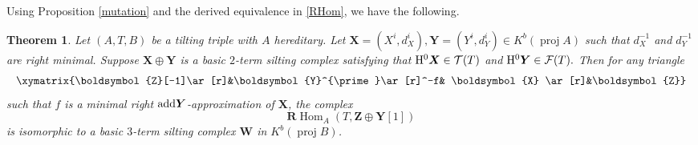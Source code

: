 \documentclass[reqno,12pt]{amsart}
\numberwithin{equation}{section}
\theoremstyle{plain}
\newtheorem{theorem}{\bf Theorem}[section]
\theoremstyle{definition}
\begin{document}
Using Proposition \ref{mutation} and the derived equivalence in \eqref{RHom}, we have the following.
\begin{theorem}\label{main1}
Let $(A, T, B)$ be a tilting triple with $A$ hereditary. Let \( \boldsymbol{X} = (X^i,d_X^i), \boldsymbol{Y} = (Y^i,d_Y^i) \in K^b(\operatorname{proj} A) \) such that $d_X^{-1}$ and $d_Y^{-1}$ are right minimal.
Suppose $\boldsymbol{X} \oplus \boldsymbol{Y}$ is a basic $2$-term silting complex satisfying that
\({\rm H}^{0}\boldsymbol{X} \in \mathcal{T}(T)\) and \({\rm H}^{0} \boldsymbol{Y} \in \mathcal{F}(T).\)
Then for any triangle
\begin{equation}\label{star3}
\xymatrix{\boldsymbol{Z}[-1]\ar[r]&\boldsymbol{Y}^{\prime}\ar[r]^-f& \boldsymbol{X} \ar[r]&\boldsymbol{Z}}
\end{equation}
such that $f$ is a minimal right ${\rm add} \boldsymbol{Y}$-approximation of $\boldsymbol{X}$, the complex
\[
\mathbf{R}\operatorname{Hom}_A
   (T,\boldsymbol{Z}\oplus\boldsymbol{Y}[1])
\]
is isomorphic to a basic $3$-term silting complex $\boldsymbol{W}$ in
$K^b(\operatorname{proj}B)$.
\end{theorem}
\end{document}
